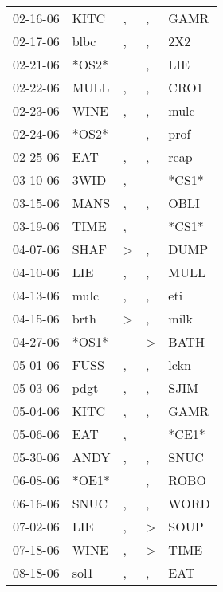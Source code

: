 \begin{supertabular}{lllll}
 02-16-06 &   KITC &             , &             , &   GAMR \\
 02-17-06 &   blbc &             , &             , &    2X2 \\
 02-21-06 &  *OS2* &               &             , &    LIE \\
 02-22-06 &   MULL &             , &             , &   CRO1 \\
 02-23-06 &   WINE &             , &             , &   mulc \\
 02-24-06 &  *OS2* &               &             , &   prof \\
 02-25-06 &    EAT &             , &             , &   reap \\
 03-10-06 &   3WID &             , &               &  *CS1* \\
 03-15-06 &   MANS &             , &             , &   OBLI \\
 03-19-06 &   TIME &             , &               &  *CS1* \\
 04-07-06 &   SHAF &  \textgreater &             , &   DUMP \\
 04-10-06 &    LIE &             , &             , &   MULL \\
 04-13-06 &   mulc &             , &             , &    eti \\
 04-15-06 &   brth &  \textgreater &             , &   milk \\
 04-27-06 &  *OS1* &               &  \textgreater &   BATH \\
 05-01-06 &   FUSS &             , &             , &   lckn \\
 05-03-06 &   pdgt &             , &             , &   SJIM \\
 05-04-06 &   KITC &             , &             , &   GAMR \\
 05-06-06 &    EAT &             , &               &  *CE1* \\
 05-30-06 &   ANDY &             , &             , &   SNUC \\
 06-08-06 &  *OE1* &               &             , &   ROBO \\
 06-16-06 &   SNUC &             , &             , &   WORD \\
 07-02-06 &    LIE &             , &  \textgreater &   SOUP \\
 07-18-06 &   WINE &             , &  \textgreater &   TIME \\
 08-18-06 &   sol1 &             , &             , &    EAT \\

\end{supertabular}

